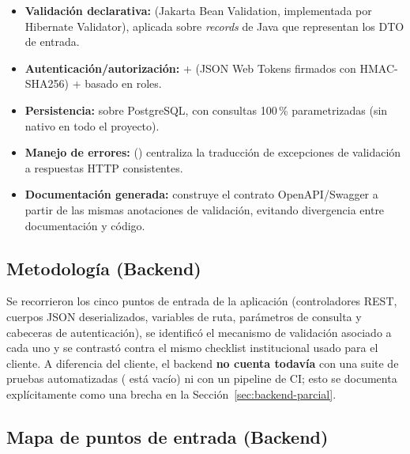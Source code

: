 \documentclass[11pt,a4paper]{article}
\begin{document}
\begin{itemize}[leftmargin=1.5cm]
    \item \textbf{Validación declarativa:} \texttt{} (Jakarta Bean Validation, implementada por Hibernate Validator), aplicada sobre \emph{records} de Java que representan los DTO de entrada.
    \item \textbf{Autenticación/autorización:} \texttt{} + \texttt{} (JSON Web Tokens firmados con HMAC-SHA256) + \texttt{} basado en roles.
    \item \textbf{Persistencia:} \texttt{} sobre PostgreSQL, con consultas 100\,\% parametrizadas (sin \texttt{} nativo en todo el proyecto).
    \item \textbf{Manejo de errores:} \texttt{} (\texttt{}) centraliza la traducción de excepciones de validación a respuestas HTTP consistentes.
    \item \textbf{Documentación generada:} \texttt{} construye el contrato OpenAPI/Swagger a partir de las mismas anotaciones de validación, evitando divergencia entre documentación y código.
\end{itemize}

\subsection{Metodología (Backend)}

Se recorrieron los cinco puntos de entrada de la aplicación (controladores REST, cuerpos JSON deserializados, variables de ruta, parámetros de consulta y cabeceras de autenticación), se identificó el mecanismo de validación asociado a cada uno y se contrastó contra el mismo checklist institucional usado para el cliente. A diferencia del cliente, el backend \textbf{no cuenta todavía} con una suite de pruebas automatizadas (\texttt{} está vacío) ni con un pipeline de CI; esto se documenta explícitamente como una brecha en la Sección~\ref{sec:backend-parcial}.

\subsection{Mapa de puntos de entrada (Backend)}
\end{document}
